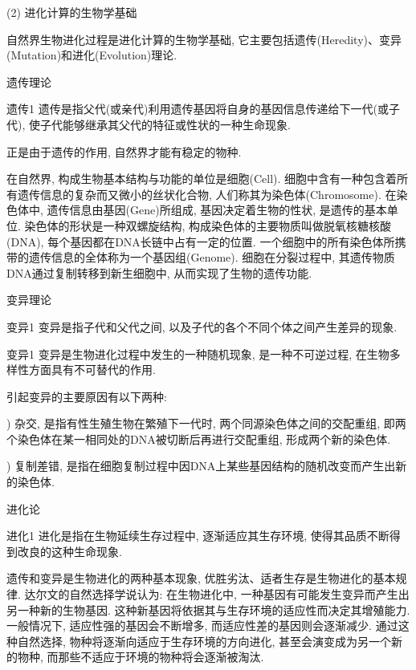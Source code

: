   (2) 进化计算的生物学基础

  自然界生物进化过程是进化计算的生物学基础, 它主要包括遗传(Heredity)、变异(Mutation)和进化(Evolution)理论.

   遗传理论
\begin{mydef}{遗传}{1}
    遗传是指父代(或亲代)利用遗传基因将自身的基因信息传递给下一代(或子代), 使子代能够继承其父代的特征或性状的一种生命现象.
\end{mydef}
  正是由于遗传的作用, 自然界才能有稳定的物种.

  在自然界, 构成生物基本结构与功能的单位是细胞(Cell). 细胞中含有一种包含着所有遗传信息的复杂而又微小的丝状化合物, 人们称其为染色体(Chromosome).
  在染色体中, 遗传信息由基因(Gene)所组成, 基因决定着生物的性状, 是遗传的基本单位.
   染色体的形状是一种双螺旋结构, 构成染色体的主要物质叫做脱氧核糖核酸(DNA), 每个基因都在DNA长链中占有一定的位置.
   一个细胞中的所有染色体所携带的遗传信息的全体称为一个基因组(Genome).
   细胞在分裂过程中, 其遗传物质DNA通过复制转移到新生细胞中, 从而实现了生物的遗传功能.

    变异理论

   \begin{mydef}{变异}{1}
    变异是指子代和父代之间, 以及子代的各个不同个体之间产生差异的现象.
    \end{mydef}
    \begin{mydef}{变异}{1}
        变异是生物进化过程中发生的一种随机现象, 是一种不可逆过程, 在生物多样性方面具有不可替代的作用.
    \end{mydef}
    引起变异的主要原因有以下两种:

    ) 杂交, 是指有性生殖生物在繁殖下一代时, 两个同源染色体之间的交配重组, 即两个染色体在某一相同处的DNA被切断后再进行交配重组, 形成两个新的染色体.

   ) 复制差错, 是指在细胞复制过程中因DNA上某些基因结构的随机改变而产生出新的染色体.

      进化论
    \begin{mydef}{进化}{1}
        进化是指在生物延续生存过程中, 逐渐适应其生存环境, 使得其品质不断得到改良的这种生命现象.
    \end{mydef}
    遗传和变异是生物进化的两种基本现象, 优胜劣汰、适者生存是生物进化的基本规律.
    达尔文的自然选择学说认为: 在生物进化中, 一种基因有可能发生变异而产生出另一种新的生物基因. 这种新基因将依据其与生存环境的适应性而决定其增殖能力. 一般情况下, 适应性强的基因会不断增多, 而适应性差的基因则会逐渐减少. 通过这种自然选择, 物种将逐渐向适应于生存环境的方向进化, 甚至会演变成为另一个新的物种, 而那些不适应于环境的物种将会逐渐被淘汰.
